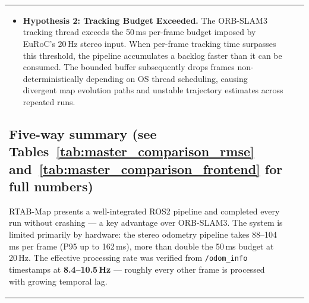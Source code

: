 \documentclass[11pt]{article}
\begin{document}
\begin{table}[ht]
\begin{tabular}{p{3.2cm}p{5.2cm}p{5.2cm}}
\begin{itemize}
    \item \textbf{Hypothesis 2: Tracking Budget Exceeded.} The ORB-SLAM3 tracking thread exceeds the 50\,ms per-frame budget imposed by EuRoC's 20\,Hz stereo input. When per-frame tracking time surpasses this threshold, the pipeline accumulates a backlog faster than it can be consumed. The bounded buffer subsequently drops frames non-deterministically depending on OS thread scheduling, causing divergent map evolution paths and unstable trajectory estimates across repeated runs.
\end{itemize}

\subsection*{Five-way summary (see Tables~\ref{tab:master_comparison_rmse} and~\ref{tab:master_comparison_frontend} for full numbers)}

RTAB-Map presents a well-integrated ROS2 pipeline and completed every run without crashing — a key advantage over ORB-SLAM3. The system is limited primarily by hardware: the stereo odometry pipeline takes 88--104\,ms per frame (P95 up to 162\,ms), more than double the 50\,ms budget at 20\,Hz. The effective processing rate was verified from \texttt{/odom\_info} timestamps at \textbf{8.4--10.5\,Hz} — roughly every other frame is processed with growing temporal lag.


\end{tabular}
\end{table}
\end{document}
